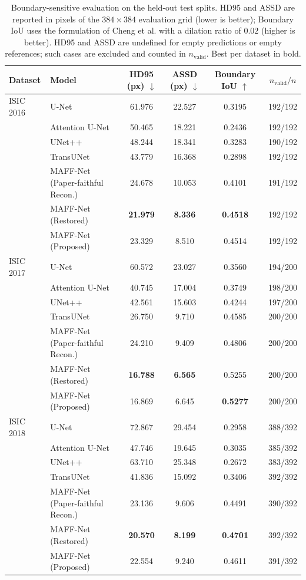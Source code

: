 \begin{table}[t]
\centering
\caption{Boundary-sensitive evaluation on the held-out test splits. HD95 and ASSD are reported in pixels of the $384\times384$ evaluation grid (lower is better); Boundary IoU uses the formulation of Cheng et al. with a dilation ratio of $0.02$ (higher is better). HD95 and ASSD are undefined for empty predictions or empty references; such cases are excluded and counted in $n_{\mathrm{valid}}$. Best per dataset in bold.}
\label{tab:boundary}
\begin{tabular}{llccc c}
\toprule
Dataset & Model & HD95 (px) $\downarrow$ & ASSD (px) $\downarrow$ & Boundary IoU $\uparrow$ & $n_{\mathrm{valid}}/n$ \\
\midrule
ISIC 2016 & U-Net & 61.976 & 22.527 & 0.3195 & 192/192 \\
 & Attention U-Net & 50.465 & 18.221 & 0.2436 & 192/192 \\
 & UNet++ & 48.244 & 18.341 & 0.3283 & 190/192 \\
 & TransUNet & 43.779 & 16.368 & 0.2898 & 192/192 \\
 & MAFF-Net (Paper-faithful Recon.) & 24.678 & 10.053 & 0.4101 & 191/192 \\
 & MAFF-Net (Restored) & \textbf{21.979} & \textbf{8.336} & \textbf{0.4518} & 192/192 \\
 & MAFF-Net (Proposed) & 23.329 & 8.510 & 0.4514 & 192/192 \\
\midrule
ISIC 2017 & U-Net & 60.572 & 23.027 & 0.3560 & 194/200 \\
 & Attention U-Net & 40.745 & 17.004 & 0.3749 & 198/200 \\
 & UNet++ & 42.561 & 15.603 & 0.4244 & 197/200 \\
 & TransUNet & 26.750 & 9.710 & 0.4585 & 200/200 \\
 & MAFF-Net (Paper-faithful Recon.) & 24.210 & 9.409 & 0.4806 & 200/200 \\
 & MAFF-Net (Restored) & \textbf{16.788} & \textbf{6.565} & 0.5255 & 200/200 \\
 & MAFF-Net (Proposed) & 16.869 & 6.645 & \textbf{0.5277} & 200/200 \\
\midrule
ISIC 2018 & U-Net & 72.867 & 29.454 & 0.2958 & 388/392 \\
 & Attention U-Net & 47.746 & 19.645 & 0.3035 & 385/392 \\
 & UNet++ & 63.710 & 25.348 & 0.2672 & 383/392 \\
 & TransUNet & 41.836 & 15.092 & 0.3406 & 392/392 \\
 & MAFF-Net (Paper-faithful Recon.) & 23.136 & 9.606 & 0.4491 & 390/392 \\
 & MAFF-Net (Restored) & \textbf{20.570} & \textbf{8.199} & \textbf{0.4701} & 392/392 \\
 & MAFF-Net (Proposed) & 22.554 & 9.240 & 0.4611 & 391/392 \\
\bottomrule
\end{tabular}
\end{table}

